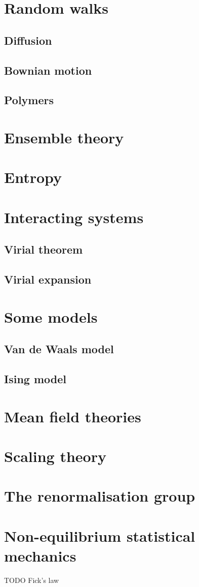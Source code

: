 \chapter{Random walks}
\section{Diffusion}
\section{Bownian motion}
\section{Polymers}

\chapter{Ensemble theory}

\chapter{Entropy}

\chapter{Interacting systems}
\section{Virial theorem}
\section{Virial expansion}

\chapter{Some models}
\section{Van de Waals model}
\section{Ising model}

\chapter{Mean field theories}

\chapter{Scaling theory}

\chapter{The renormalisation group}

\chapter{Non-equilibrium statistical mechanics}

TODO Fick's law